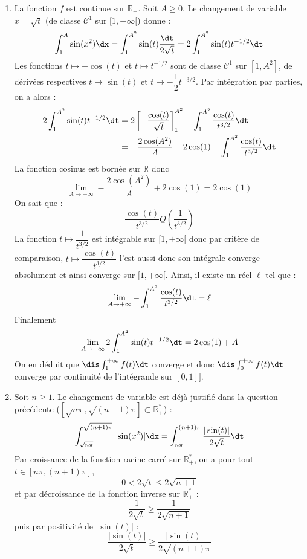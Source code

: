 \documentclass[a4paper,10pt]{report}
\begin{document}
\corr 

\begin{enumerate}
\item La fonction $f$ est continue sur $\mathbb{R}_+$. Soit $A \geq 0$. Le changement de variable $x= \sqrt{t}$ (de classe $\mathcal{C}^1$ sur $[1, + \infty[$) donne :
$$ \int_1^A \sin(x^2) \dx = \int_1^{A^2} \sin(t) \dfrac{\dt}{2 \sqrt{t}} = 2 \int_1^{A^2} \sin(t) t^{-1/2} \dt$$
Les fonctions $t \mapsto - \cos(t)$ et $t \mapsto t^{-1/2}$ sont de classe $\mathcal{C}^1$ sur $[1, A^2]$, de dérivées respectives $t \mapsto \sin(t)$ et $t \mapsto - \dfrac{1}{2} t^{-3/2}$. Par intégration par parties, on a alors :
\begin{align*}
2 \int_1^{A^2} \sin(t) t^{-1/2} \dt & = 2\left[- \dfrac{\cos(t)}{\sqrt{t}} \right]_1^{A^2} - \int_1^{A^2} \dfrac{\cos(t)}{t^{3/2}} \dt \\
& = - \dfrac{2 \cos(A^2)}{A} +2\cos(1)  - \int_1^{A^2} \dfrac{\cos(t)}{t^{3/2}} \dt 
\end{align*}
La fonction cosinus est bornée sur $\mathbb{R}$ donc 
$$ \lim_{A \rightarrow + \infty}  - \dfrac{2 \cos(A^2)}{A} +2\cos(1) =  2\cos(1)$$
On sait que :
$$ \dfrac{\cos(t)}{t^{3/2}} \underset{=} O \left( \dfrac{1}{t^{3/2}} \right)$$
La fonction $t \mapsto  \dfrac{1}{t^{3/2}}$ est intégrable sur $[1, + \infty[$ donc par critère de comparaison, $t \mapsto \dfrac{\cos(t)}{t^{3/2}}$ l'est aussi donc son intégrale converge absolument et ainsi converge sur $[1, + \infty[$. Ainsi, il existe un réel $\ell$ tel que :
$$ \lim_{A \rightarrow + \infty} - \int_1^{A^2} \dfrac{\cos(t)}{t^{3/2}} \dt  = \ell$$
Finalement 
$$ \lim_{A \rightarrow + \infty} 2 \int_1^{A^2} \sin(t) t^{-1/2} \dt = 2 \cos(1) + A$$
On en déduit que $\dis \int_{1}^{+ \infty}  f(t) \dt$ converge et donc $\dis \int_{0}^{+ \infty}  f(t) \dt$ converge par continuité de l'intégrande sur $[0,1]]$.
\item Soit $n \geq 1$. Le changement de variable est déjà justifié dans la question précédente ($[\sqrt{n \pi},\sqrt{(n+1)\pi}]\subset \mathbb{R}_+^*$) :
$$ \int_{\sqrt{n \pi}}^{\sqrt{(n+1)\pi}} \vert \sin(x^2) \vert \dx = \int_{n \pi}^{(n+1)\pi} \dfrac{\vert \sin(t) \vert}{2 \sqrt{t}} \dt$$
Par croissance de la fonction racine carré sur $\mathbb{R}_+^{*}$, on a pour tout $t \in [n \pi,(n+1)\pi]$, 
$$ 0<2 \sqrt{t} \leq 2 \sqrt{n+1}$$
et par décroissance de la fonction inverse sur $\mathbb{R}_+^{*}$ :
$$ \dfrac{1}{2\sqrt{t}} \geq \dfrac{1}{2\sqrt{n+1}}$$
puis par positivité de $\vert \sin(t) \vert$ :
$$ \dfrac{\vert \sin(t) \vert}{2 \sqrt{t}} \geq \dfrac{\vert \sin(t) \vert}{2 \sqrt{(n+1)\pi}}$$

\end{enumerate}
\end{document}
